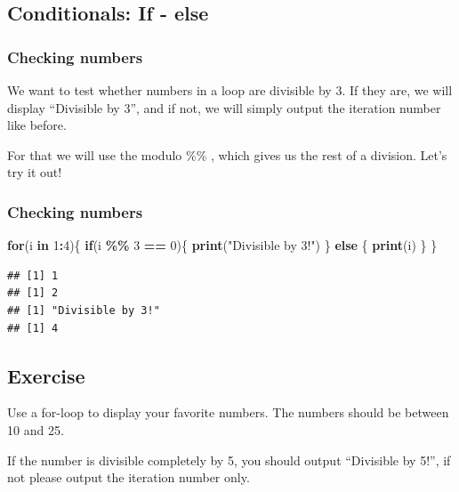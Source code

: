\documentclass[
]{book}
\newenvironment{Shaded}{\begin{snugshade}}{\end{snugshade}}
\newcommand{\ControlFlowTok}[1]{\textcolor[rgb]{0.13,0.29,0.53}{\textbf{#1}}}
\newcommand{\DecValTok}[1]{\textcolor[rgb]{0.00,0.00,0.81}{#1}}
\newcommand{\FunctionTok}[1]{\textcolor[rgb]{0.13,0.29,0.53}{\textbf{#1}}}
\newcommand{\NormalTok}[1]{#1}
\newcommand{\SpecialCharTok}[1]{\textcolor[rgb]{0.81,0.36,0.00}{\textbf{#1}}}
\newcommand{\StringTok}[1]{\textcolor[rgb]{0.31,0.60,0.02}{#1}}
\begin{document}
\subsection{Conditionals: If - else}\label{conditionals-if---else-1}

\subsubsection{Checking numbers \textbar{}}\label{checking-numbers}

We want to test whether numbers in a loop are divisible by 3. If they are, we will display ``Divisible by 3'', and if not, we will simply output the iteration number like before.

For that we will use the modulo \%\% , which gives us the rest of a division. Let's try it out!

\subsubsection{Checking numbers \textbar\textbar{}}\label{checking-numbers-1}

\begin{Shaded}
\begin{Highlighting}[]
\ControlFlowTok{for}\NormalTok{(i }\ControlFlowTok{in} \DecValTok{1}\SpecialCharTok{:}\DecValTok{4}\NormalTok{)\{}
  \ControlFlowTok{if}\NormalTok{(i }\SpecialCharTok{\%\%} \DecValTok{3} \SpecialCharTok{==} \DecValTok{0}\NormalTok{)\{}
    \FunctionTok{print}\NormalTok{(}\StringTok{"Divisible by 3!"}\NormalTok{)}
\NormalTok{  \} }\ControlFlowTok{else}\NormalTok{ \{}
    \FunctionTok{print}\NormalTok{(i) }
\NormalTok{  \}}
\NormalTok{\}}
\end{Highlighting}
\end{Shaded}

\begin{verbatim}
## [1] 1
## [1] 2
## [1] "Divisible by 3!"
## [1] 4
\end{verbatim}

\subsection{Exercise}\label{exercise-4}

Use a for-loop to display your favorite numbers.
The numbers should be between 10 and 25.

If the number is divisible completely by 5, you should output ``Divisible by 5!'', if not please output the iteration number only.
\end{document}
